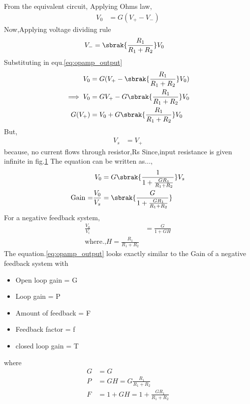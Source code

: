 \begin{enumerate}[label=\thesubsection.\arabic*.,ref=\thesubsection.\theenumi]
\begin{figure}[!ht]
\begin{center}
		\resizebox{\columnwidth}{!}{}
	\end{center}
\caption{}
\label{fig:equivalent_circuit}
\end{figure}
From the equivalent circuit,
Applying Ohms law,
\begin{align}
V_0 &= G(V_+ - V_-) \label{eq:opamp_output}
\end{align}
Now,Applying voltage dividing rule
\begin{align}
V_- &= \sbrak{\frac{R_1}{R_1+R_2}}V_0
\end{align}
Substituting in equ.\ref{eq:opamp_output}
\begin{align}
    V_0 &= G(V_+-\sbrak{\frac{R_1}{R_1+R_2}}V_0)
    \\
\implies V_0 &= GV_+-G\sbrak{\frac{R_1}{R_1+R_2}}V_0
    \\
G(V_+)&=V_0+G\sbrak{\frac{R_1}{R_1+R_2}}V_0
\end{align}
But,
\begin{align}
    V_s &= V_+
\end{align}
because, no current flows through resistor,Rs Since,input resistance is given infinite in fig.\ref{fig:equivalent_circuit} 
The equation can be written as...,
\begin{align}
    V_0 &= G\sbrak{\frac{1}{1+\frac{GR_1}{R_1+R_2}}}V_s
    \\
 \text{Gain =}\frac{V_0}{V_s}&=\sbrak{\frac{G}{1+\frac{GR_1}{R_1+R_2}}}\label{eq:opamp_gain}
\end{align}
For a negative feedback system,
\begin{align}
   \frac{V_0}{V_i} &= \frac{G}{1+GH}
  \\
  \text{where.,} H = \frac{R_1}{R_1+R_2}
\end{align}
The equation.\ref{eq:opamp_output} looks exactly similar to the Gain of a negative feedback system with
\begin{itemize}
    \item Open loop gain = G
    \item Loop gain = P 
    \item Amount of feedback = F
    \item Feedback factor = f
    \item closed loop gain = T
\end{itemize}
where
\begin{align}
    G &= G\\
    P &= GH = G\frac{R_1}{R_1+R_2}\\
    F &= 1+GH= 1 + \frac{GR_1}{R_1+R_2}\\

\end{align}
\end{enumerate}
